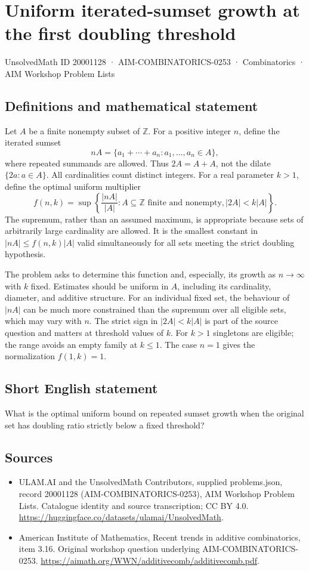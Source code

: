 \documentclass[11pt,a4paper]{article}
\begin{document}
\section*{Uniform iterated-sumset growth at the first doubling threshold}\label{20001128}
{\small UnsolvedMath ID 20001128 · AIM-COMBINATORICS-0253 · Combinatorics · AIM Workshop Problem Lists}
\subsection{Definitions and mathematical statement}
Let $A$ be a finite nonempty subset of $\mathbb Z$. For a positive
integer $n$, define the iterated sumset
\[
                 nA=\{a_1+\cdots+a_n:a_1,\ldots,a_n\in A\},
\]
where repeated summands are allowed. Thus $2A=A+A$, not the dilate
$\{2a:a\in A\}$. All cardinalities count distinct integers.
For a real parameter $k>1$, define the optimal uniform multiplier
\[
 f(n,k)=\sup\left\{\frac{|nA|}{|A|}:
       A\subseteq\mathbb Z\text{ finite and nonempty},
                                      |2A|<k|A|\right\}.
\]
The supremum, rather than an assumed maximum, is appropriate because
sets of arbitrarily large cardinality are allowed. It is the smallest
constant in $|nA|\le f(n,k)|A|$ valid simultaneously for all sets
meeting the strict doubling hypothesis.

The problem asks to determine this function and, especially, its
growth as $n\to\infty$ with $k$ fixed. Estimates should be uniform
in $A$, including its cardinality, diameter, and additive structure.
For an individual fixed set, the behaviour of $|nA|$ can be much
more constrained than the supremum over all eligible sets, which
may vary with $n$. The strict sign in $|2A|<k|A|$ is part of the
source question and matters at threshold values of $k$. For $k>1$
singletons are eligible; the range avoids an empty family at
$k\le1$. The case $n=1$ gives the normalization $f(1,k)=1$.
\subsection{Short English statement}
What is the optimal uniform bound on repeated sumset growth when the original set has doubling ratio strictly below a fixed threshold?
\subsection{Sources}
\begin{itemize}
\item[S1] ULAM.AI and the UnsolvedMath Contributors, supplied problems.json, record 20001128 (AIM-COMBINATORICS-0253), AIM Workshop Problem Lists. Catalogue identity and source transcription; CC BY 4.0.
\url{https://huggingface.co/datasets/ulamai/UnsolvedMath}.
\item[S2] American Institute of Mathematics, Recent trends in additive combinatorics, item 3.16. Original workshop question underlying AIM-COMBINATORICS-0253.
\url{https://aimath.org/WWN/additivecomb/additivecomb.pdf}.
\end{itemize}
\end{document}
